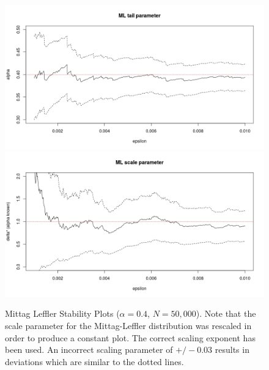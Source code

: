\documentclass[honours,12pt]{unswthesis}
\newcommand{\1}{\mathbf 1}
\numberwithin{equation}{section}
\theoremstyle{definition}
\theoremstyle{remark}
\begin{document}


\begin{figure}[h]
    \centering
    \includegraphics[width=\textwidth]{Figures/MLtail01}
    \includegraphics[width=\textwidth]{Figures/MLscale01Fix}
    \caption{Mittag Leffler Stability Plots ($\alpha=0.4$, $N=50,000$). Note that the scale parameter for the Mittag-Leffler distribution was rescaled in order to produce a constant plot. The correct scaling exponent has been used. An incorrect scaling parameter of $+/-0.03$ results in deviations which are similar to the dotted lines.}\label{fig:MLstability}
\end{figure}
\end{document}
